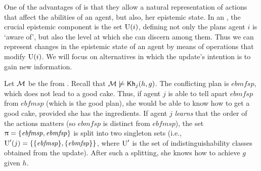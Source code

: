 One of the advantages of  is that they allow a  natural
representation of actions that affect the abilities of an agent, but also, her epistemic state. In an
\ults, the crucial epistemic component is the set $\operatorname{U}(i)$,
defining not only the plans agent $i$ is `aware of',
but also the level at which she can discern among
them. Thus we can represent changes in the epistemic state of
an agent by means of operations that modify $\operatorname{U}(i)$. We will focus on alternatives in which the update's intention is to gain new information.

\medskip

\begin{example}\label{ex:ref}
    Let $\mathcal{M}$ be the \ults from .
    Recall that $\mathcal{M}\not\models{\sf Kh}_j(h,g)$. The conflicting plan is $\mathit{ebmfsp}$, which does not lead to a good cake. Thus, if agent $j$ is able to tell apart $\mathit{ebmfsp}$ from $\mathit{ebfmsp}$ (which is the good plan), she would be able to know how to get a good cake, provided she has the ingredients. If agent $j$ \emph{learns} that the
    order of the actions matters (so $\mathit{ebmfsp}$ is distinct from $\mathit{ebfmsp}$), the set $\uppi=\{ \mathit{ebfmsp}, \mathit{ebmfsp} \}$ is split into two singleton sets (i.e., $\operatorname{U}'(j)=\{ \{ \mathit{ebfmsp} \},\{ \mathit{ebmfsp} \} \}$, where $\operatorname{U}'$ is the set of indistinguishability classes obtained from the update). After such a splitting, she knows how to achieve $g$ given $h$.
\end{example}

\medskip




